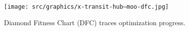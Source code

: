 \begin{figure}[H]
	\centering
	\texttt{[image: src/graphics/x-transit-hub--moo-dfc.jpg]}
	\caption*{%
		Diamond Fitness Chart (DFC) traces optimization progress.
	}
	\vspace*{-0.5\baselineskip}%
	\label{
		fig:x-transit-hub--moo-dfc
	}
\end{figure}
